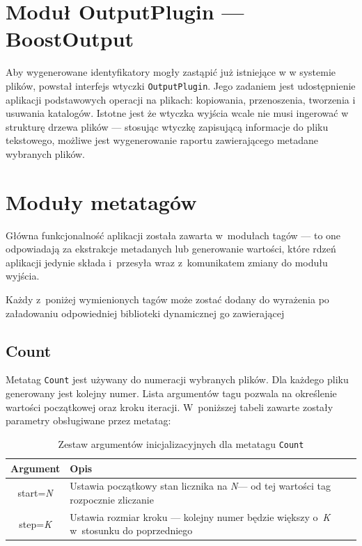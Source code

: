 \section{Moduł OutputPlugin --- BoostOutput}
\par
Aby wygenerowane identyfikatory mogły zastąpić już istniejące w w systemie plików, powstał interfejs wtyczki \texttt{OutputPlugin}. Jego zadaniem jest udostępnienie aplikacji podstawowych operacji na plikach: kopiowania, przenoszenia, tworzenia i usuwania katalogów.
Istotne jest że wtyczka wyjścia wcale nie musi ingerować w strukturę drzewa plików --- stosując wtyczkę zapisującą informacje do pliku tekstowego, możliwe jest wygenerowanie raportu zawierającego metadane wybranych plików.


\section{Moduły metatagów}
\par
Główna funkcjonalność aplikacji została zawarta w~modułach tagów --- to one odpowiadają za ekstrakcje metadanych lub generowanie wartości, które rdzeń aplikacji jedynie składa i~przesyła wraz z~komunikatem zmiany do modułu wyjścia.
\par
Każdy z~poniżej wymienionych tagów może zostać dodany do wyrażenia po załadowaniu odpowiedniej biblioteki dynamicznej go zawierającej

\subsection{Count}
\par
Metatag \texttt{Count} jest używany do numeracji wybranych plików.
Dla każdego pliku generowany jest kolejny numer. Lista argumentów tagu pozwala na określenie wartości początkowej oraz kroku iteracji.
W~poniższej tabeli zawarte zostały parametry obsługiwane przez metatag:
\begin{table}[h]
\begin{center}
\begin{tabular}{| c | p{13cm} |}
\hline
\textbf{Argument} & \textbf{Opis} \\
\hline
start=\textit{N} & Ustawia początkowy stan licznika na \textit{N}--- od tej wartości tag rozpocznie zliczanie \\
step=\textit{K} & Ustawia rozmiar kroku --- kolejny numer będzie większy o~\textit{K} w~stosunku do poprzedniego \\
\hline
\end{tabular} \end{center}
\caption{Zestaw argumentów inicjalizacyjnych dla metatagu \texttt{Count}}
\end{table}

